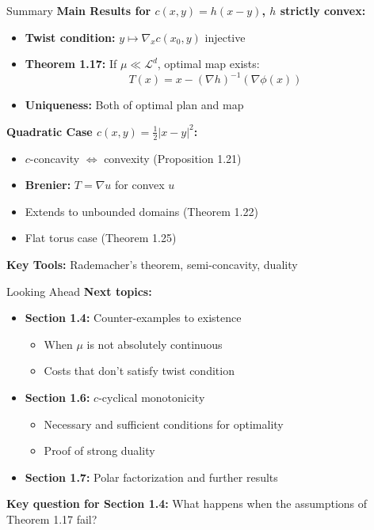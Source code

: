 \documentclass[aspectratio=169]{beamer}
\newcommand{\Ld}{\mathcal{L}^d}
\begin{document}
\begin{frame}{Summary}
\textbf{Main Results for $c(x,y) = h(x-y)$, $h$ strictly convex:}

\vspace{0.2cm}
\begin{itemize}
    \item \textbf{Twist condition:} $y \mapsto \nabla_x c(x_0, y)$ injective
    \item \textbf{Theorem 1.17:} If $\mu \ll \Ld$, optimal map exists:
    \[
    T(x) = x - (\nabla h)^{-1}(\nabla\phi(x))
    \]
    \item \textbf{Uniqueness:} Both of optimal plan and map
\end{itemize}

\vspace{0.3cm}
\textbf{Quadratic Case $c(x,y) = \frac{1}{2}|x-y|^2$:}
\begin{itemize}
    \item $c$-concavity $\Leftrightarrow$ convexity (Proposition 1.21)
    \item \textbf{Brenier:} $T = \nabla u$ for convex $u$
    \item Extends to unbounded domains (Theorem 1.22)
    \item Flat torus case (Theorem 1.25)
\end{itemize}

\vspace{0.3cm}
\textbf{Key Tools:} Rademacher's theorem, semi-concavity, duality
\end{frame}

\begin{frame}{Looking Ahead}
\textbf{Next topics:}

\vspace{0.3cm}
\begin{itemize}
    \item \textbf{Section 1.4:} Counter-examples to existence
    \begin{itemize}
        \item When $\mu$ is not absolutely continuous
        \item Costs that don't satisfy twist condition
    \end{itemize}

    \vspace{0.3cm}
    \item \textbf{Section 1.6:} $c$-cyclical monotonicity
    \begin{itemize}
        \item Necessary and sufficient conditions for optimality
        \item Proof of strong duality
    \end{itemize}

    \vspace{0.3cm}
    \item \textbf{Section 1.7:} Polar factorization and further results
\end{itemize}

\vspace{0.4cm}
\textbf{Key question for Section 1.4:} What happens when the assumptions of Theorem 1.17 fail?
\end{frame}
\end{document}

